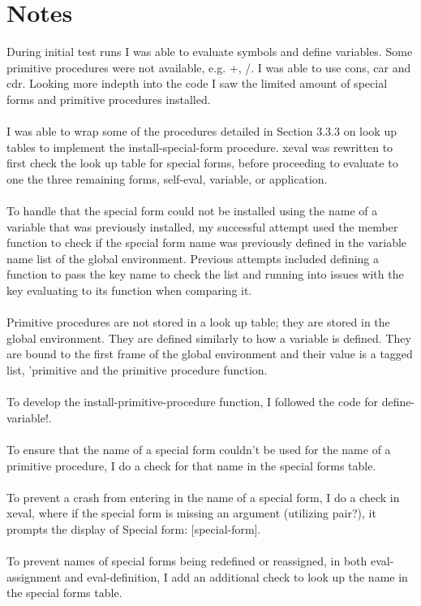 \documentclass[a4paper,12pt]{article}
\begin{document}
\section{Notes}
During initial test runs I was able to evaluate symbols and define variables. Some primitive procedures were not available, e.g. +, /. I was able to use cons, car and cdr. Looking more indepth into the code I saw the limited amount of special forms and primitive procedures installed.\\
\\
I was able to wrap some of the procedures detailed in Section 3.3.3 on look up tables to implement the install-special-form procedure. xeval was rewritten to first check the look up table for special forms, before proceeding to evaluate to one the three remaining forms, self-eval, variable, or application.\\
\\
To handle that the special form could not be installed using the name of a variable that was previously installed, my successful attempt used the member function to check if the special form name was previously defined in the variable name list of the global environment. Previous attempts included defining a function to pass the key name to check the list and running into issues with the key evaluating to its function when comparing it.\\
\\
Primitive procedures are not stored in a look up table; they are stored in the global environment. They are defined similarly to how a variable is defined. They are bound to the first frame of the global environment and their value is a tagged list, 'primitive and the primitive procedure function.\\
\\
To develop the install-primitive-procedure function, I followed the code for define-variable!.\\
\\
To ensure that the name of a special form couldn't be used for the name of a primitive procedure, I do a check for that name in the special forms table.\\
\\
To prevent a crash from entering in the name of a special form, I do a check in xeval, where if the special form is missing an argument (utilizing pair?), it prompts the display of Special form: [special-form].\\
\\
\newpage
To prevent names of special forms being redefined or reassigned, in both eval-assignment and eval-definition, I add an additional check to look up the name in the special forms table.\\
\end{document}
